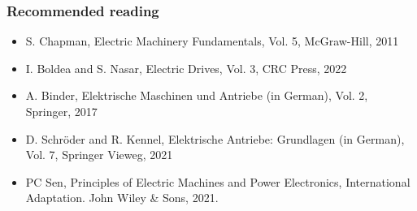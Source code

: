 \begin{frame}
	\frametitle{Recommended reading}
	\begin{itemize}
		\item S. Chapman, Electric Machinery Fundamentals, Vol. 5, McGraw-Hill, 2011
		\item I. Boldea and S. Nasar, Electric Drives, Vol. 3, CRC Press, 2022
		\item A. Binder, Elektrische Maschinen und Antriebe (in German), Vol. 2, Springer, 2017
		\item D. Schr\"oder and R. Kennel, Elektrische Antriebe: Grundlagen (in German), Vol. 7, Springer Vieweg, 2021
		\item PC Sen, Principles of Electric Machines and Power Electronics, International Adaptation. John Wiley \& Sons, 2021.
	\end{itemize}
\end{frame} 